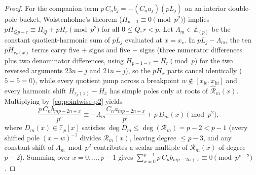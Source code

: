 \documentclass[11pt,reqno]{amsart}
\theoremstyle{definition}
\theoremstyle{remark}
\newcommand{\ZZ}{\mathbb{Z}}
\newcommand{\FF}{\mathbb{F}}
\begin{document}
\begin{proof}
For the companion term $p\,C_n b_j = -(C_n a_j)(p L_j)$ on an interior double-pole bucket, Wolstenholme's theorem ($H_{p-1} \equiv 0 \pmod{p^2}$) implies $p H_{Qp + r} \equiv H_Q + p H_r \pmod{p^2}$ for all $0 \le Q, r < p$. Let $\Lambda_m \in \ZZ_{(p)}$ be the constant quotient-harmonic sum of $p L_j$ evaluated at $x = x_\star$. In $p L_j - \Lambda_m$, the ten $p H_{r_k(x)}$ terms carry five $+$ signs and five $-$ signs (three numerator differences plus two denominator differences, using $H_{p-1-r} \equiv H_r \pmod p$ for the two reversed arguments $23n - j$ and $21n - j$), so the $p H_x$ parts cancel identically ($5 - 5 = 0$), while every quotient jump across a breakpoint $w \notin [x_{\mathrm{lo}}, x_{\mathrm{hi}}]$ and every harmonic shift $H_{r_k(x)} - H_x$ has simple poles only at roots of $\widehat{\mathcal{R}}_m(x)$. Multiplying by~\eqref{eq:pointwise-p2} yields
\[
  \frac{p\, C_n b_{mp-2n+x}}{p^v}
  \equiv -\Lambda_m \frac{C_n a_{mp-2n+x}}{p^v} + p\, D_m(x) \pmod{p^2},
\]
where $D_m(x) \in \FF_p[x]$ satisfies $\deg D_m \le \deg(\mathcal{R}_m) = p - 2 < p - 1$ (every shifted pole $(x - w)^{-1}$ divides $\mathcal{R}_m(x)$, leaving degree $\le p - 3$, and any constant shift of $\Lambda_m \bmod p^2$ contributes a scalar multiple of $\mathcal{R}_m(x)$ of degree $p - 2$). Summing over $x = 0, \ldots, p-1$ gives $\sum_{x=0}^{p-1} p\,C_n b_{mp-2n+x} \equiv 0 \pmod{p^{v+2}}$.


\end{proof}
\end{document}
